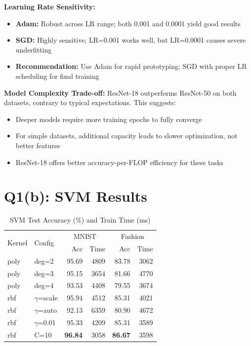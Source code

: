 \documentclass[conference]{IEEEtran}
\begin{document}
\textbf{Learning Rate Sensitivity:}
\begin{itemize}
    \item \textbf{Adam:} Robust across LR range; both 0.001 and 0.0001 yield good results
    \item \textbf{SGD:} Highly sensitive; LR=0.001 works well, but LR=0.0001 causes severe underfitting
    \item \textbf{Recommendation:} Use Adam for rapid prototyping; SGD with proper LR scheduling for final training
\end{itemize}

\textbf{Model Complexity Trade-off:}
ResNet-18 outperforms ResNet-50 on both datasets, contrary to typical expectations. This suggests:
\begin{itemize}
    \item Deeper models require more training epochs to fully converge
    \item For simple datasets, additional capacity leads to slower optimization, not better features
    \item ResNet-18 offers better accuracy-per-FLOP efficiency for these tasks
\end{itemize}

\section{Q1(b): SVM Results}

\begin{table}[h]
\centering
\caption{SVM Test Accuracy (\%) and Train Time (ms)}
\label{tab:svm}
\begin{tabular}{llrrrr}
\toprule
\multirow{2}{*}{Kernel} & \multirow{2}{*}{Config} & \multicolumn{2}{c}{MNIST} & \multicolumn{2}{c}{Fashion} \\
& & Acc & Time & Acc & Time \\
\midrule
poly & deg=2 & 95.69 & 4809 & 83.78 & 3062 \\
poly & deg=3 & 95.15 & 3654 & 81.66 & 4770 \\
poly & deg=4 & 93.53 & 4408 & 79.55 & 3674 \\
rbf & $\gamma$=scale & 95.94 & 4512 & 85.31 & 4021 \\
rbf & $\gamma$=auto & 92.13 & 6359 & 80.90 & 4672 \\
rbf & $\gamma$=0.01 & 95.33 & 4209 & 85.31 & 3589 \\
rbf & C=10 & \textbf{96.84} & 3058 & \textbf{86.67} & 3598 \\
\bottomrule
\end{tabular}
\end{table}
\end{document}
